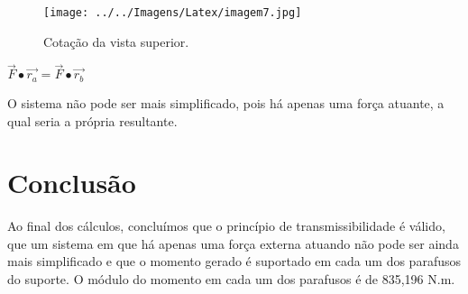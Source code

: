 \documentclass[
	12pt,				%
	oneside,			%
	a4paper,			%
	english,			%
	french,				%
	spanish,			%
	brazil,				%
	]{abntex2}
\begin{document}
\begin{figure}[H]
\center
\caption{Cotação da vista superior.}
\texttt{[image: ../../Imagens/Latex/imagem7.jpg]}  

\end{figure}

\begin{center}
$\vec{F}\bullet\vec{r_{a}} = \vec{F}\bullet\vec{r_{b}}$
\end{center}

O sistema não pode ser mais simplificado, pois há apenas uma força atuante, a qual seria a própria resultante.

\newpage
\section[Conclusão]{Conclusão}
\pagestyle{fancy}

Ao final dos cálculos, concluímos que o princípio de transmissibilidade é válido, que um sistema em que há apenas uma força externa atuando não pode ser ainda mais simplificado e que o momento gerado é suportado em cada um dos parafusos do suporte. O módulo do momento em cada um dos parafusos é de 835,196 N.m. 

\newpage



%
%
\end{document}

